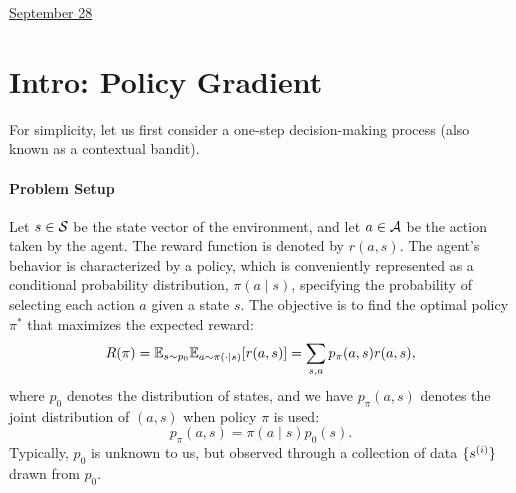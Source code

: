 \documentclass[11pt,letterpaper]{article}
\begin{document}
\href{run:2025-09-28.tex}{\Huge September 28} 

\section{Intro: Policy Gradient} 


For simplicity, let us first 
consider a one-step decision-making process (also known as a contextual bandit).  




\paragraph{Problem Setup}    
Let $s \in \mathcal{S}$ be the state vector of the environment, and let $a \in \mathcal{A}$ be the action taken by the agent.  
The reward function is denoted by $r(a,s)$.  
%
The agent's behavior is characterized by a policy, which is conveniently represented as a conditional probability distribution,  
$\pi(a \mid s)$,  
specifying the probability of selecting each action $a$ given a state $s$.  
%
The objective is to find the optimal policy $\pi^*$ that maximizes the expected reward:  
\[
R(\pi) = \mathbb{E}_{s\sim p_0}\mathbb{E}_{a\sim \pi(\cdot | s)} [r(a,s)] = \sum_{s,a} p_\pi(a, s) r(a,s),
\]
where $p_0$ denotes the distribution of states,
and we have $p_{\pi}(a,s)$ denotes the joint distribution of $(a,s)$ when policy $\pi$ is used: 
$$
p_\pi(a,s) = \pi(a\mid s) p_0(s). 
$$
Typically, $p_0$ is unknown to us, but observed through a collection of data $\{s^{(i)}\}$ drawn from $p_0$. 


\usetikzlibrary{arrows.meta, positioning, shadows.blur}
\begin{center}
\end{center}
\end{document}
